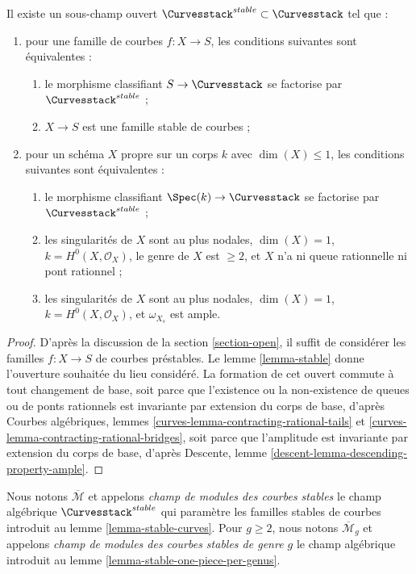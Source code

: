 \begin{lemma}
\label{lemma-stable-curves}
Il existe un sous-champ ouvert $\Curvesstack^{stable} \subset \Curvesstack$
tel que :
\begin{enumerate}
\item pour une famille de courbes $f : X \to S$, les conditions suivantes sont équivalentes :
\begin{enumerate}
\item le morphisme classifiant $S \to \Curvesstack$ se factorise
par $\Curvesstack^{stable}$ ;
\item $X \to S$ est une famille stable de courbes ;
\end{enumerate}
\item pour un schéma $X$ propre sur un corps $k$ avec
$\dim(X) \leq 1$, les conditions suivantes sont équivalentes :
\begin{enumerate}
\item le morphisme classifiant $\Spec(k) \to \Curvesstack$
se factorise par $\Curvesstack^{stable}$ ;
\item les singularités de $X$ sont au plus nodales, $\dim(X) = 1$,
$k = H^0(X, \mathcal{O}_X)$, le genre de $X$ est $\geq 2$, et
$X$ n'a ni queue rationnelle ni pont rationnel ;
\item les singularités de $X$ sont au plus nodales, $\dim(X) = 1$,
$k = H^0(X, \mathcal{O}_X)$, et $\omega_{X_s}$ est ample.
\end{enumerate}
\end{enumerate}
\end{lemma}

\begin{proof}
D'après la discussion de la section \ref{section-open},
il suffit de considérer les familles $f : X \to S$ de
courbes préstables. Le lemme \ref{lemma-stable}
donne l'ouverture souhaitée du lieu considéré.
La formation de cet ouvert commute à tout changement de base,
soit parce que l'existence ou la non-existence de queues ou de ponts rationnels
est invariante par extension du corps de base, d'après
Courbes algébriques, lemmes
\ref{curves-lemma-contracting-rational-tails} et
\ref{curves-lemma-contracting-rational-bridges},
soit parce que l'amplitude est invariante par extension du corps de base, d'après
Descente, lemme \ref{descent-lemma-descending-property-ample}.
\end{proof}

\begin{definition}
\label{definition-deligne-mumford}
\begin{reference}
\cite{DM}
\end{reference}
Nous notons $\overline{\mathcal{M}}$ et appelons
{\it champ de modules des courbes stables} le champ algébrique
$\Curvesstack^{stable}$ qui paramètre les familles stables de courbes
introduit au lemme \ref{lemma-stable-curves}.
Pour $g \geq 2$, nous notons $\overline{\mathcal{M}}_g$ et appelons
{\it champ de modules des courbes stables de genre $g$}
le champ algébrique introduit au lemme \ref{lemma-stable-one-piece-per-genus}.
\end{definition}

